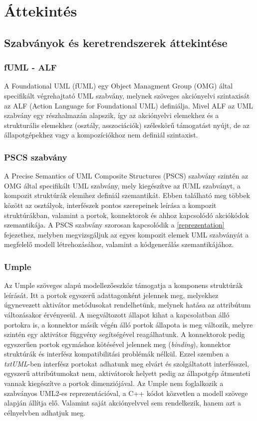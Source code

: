 \documentclass[a4paper,12pt]{report}
\begin{document}
\chapter{Áttekintés}

\section{Szabványok és keretrendszerek áttekintése}
\subsection{fUML - ALF}
A Foundational UML (fUML) \cite{fmul} egy Object Managment Group (OMG) által specifikált végrehajtató UML szabvány, 
melynek szöveges akciónyelvi szintaxisát az ALF (Action Language for Foundational UML) \cite{alf} definiálja.
Mivel ALF az UML szabvány egy részhalmazán alapszik, így az akciónyelvi elemekhez és a strukturális elemekhez (osztály, asszociációk)  széleskörű támogatást nyújt, de az állapotgépekhez vagy a kompozíciókhoz nem definiál szintaxist.

\subsection{PSCS szabvány}
A  Precise Semantics of UML Composite Structures (PSCS)  szabvány \cite{pscs} szintén az OMG által specifikált UML szabvány, mely kiegészítve az fUML szabványt, a kompozit struktúrák elemihez definiál szemantikát. Ebben található meg többek között az osztályok, interfészek pontos szerepeinek leírása a kompozit struktúrákban, valamint a portok, konnektorok és ahhoz kapcsolódó akciókódok szemantikája. A PSCS szabvány szorosan kapcsolódik a \ref{reprezentation} fejezethez, melyben megvizsgáljuk az egyes kompozit elemek UML szabványát a megfelelő modell létrehozásához, valamint a kódgenerálás szemantikájához.

\subsection{Umple}
Az Umple \cite{umple} szöveges alapú modellezőeszköz támogatja a komponens struktúrák leírását. Itt a portok egyszerű adattagonként jelennek meg, melyekhez úgynevezett aktivátor metódusokat rendelhetünk, melynek hatása az attribútum változásakor érvényesül. A megváltozott állapot kihat a kapcsolatban álló portokra is, a konnektor másik végén álló portok állapota is meg változik, melyre szintén egy aktivátor függvény segítségével reagálhatunk. A konnektorok pedig egyszerűen portok egymáshoz kötésével jelennek meg (\textit{binding}), konnektor struktúrák és interfész kompatibilitási problémák nélkül. Ezzel szemben a \textit{txtUML}-ben interfész portokat adhatunk meg elvárt és szolgáltatott interfésszel, egyszerű attribútumokat nem, aktivátorok helyett pedig az állapotgép átmenteti vannak kiegészítve a portok dimenziójával. Az Umple nem foglalkozik a szabványos UML2-es reprezentációval, a C++ kódot közvetlen a modell szövege alapján állítja elő. Valamint saját akciónyelvvel sem rendelkezik, hanem azt a célnyelvben adhatjuk meg. \\
\end{document}

